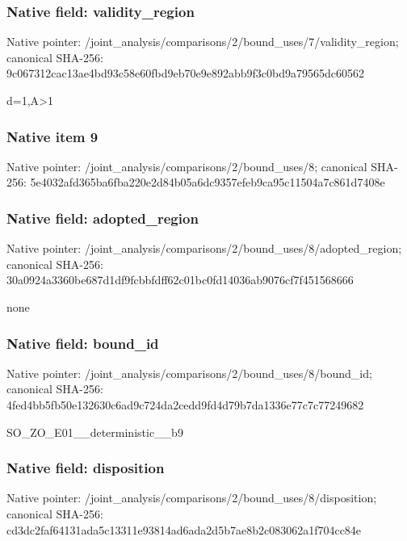 \documentclass[10pt,a4paper]{article}
\begin{document}
\subsubsection{Native field: validity\_\allowbreak{}region}
Native pointer: /joint\_\allowbreak{}analysis/comparisons/2/bound\_\allowbreak{}uses/7/validity\_\allowbreak{}region; canonical SHA-256: 9c067312cac13ae4bd93c58e60fbd9eb70e9e892abb9f3c0bd9a79565dc60562

\begingroup\raggedright\sloppy d=\allowbreak{}1,\allowbreak{}A>1\par\endgroup

\subsubsection{Native item 9}
Native pointer: /joint\_\allowbreak{}analysis/comparisons/2/bound\_\allowbreak{}uses/8; canonical SHA-256: 5e4032afd365ba6fba220e2d84b05a6dc9357efeb9ca95c11504a7c861d7408e

\subsubsection{Native field: adopted\_\allowbreak{}region}
Native pointer: /joint\_\allowbreak{}analysis/comparisons/2/bound\_\allowbreak{}uses/8/adopted\_\allowbreak{}region; canonical SHA-256: 30a0924a3360be687d1df9fcbbfdff62c01bc0fd14036ab9076cf7f451568666

\begingroup\raggedright\sloppy none\par\endgroup

\subsubsection{Native field: bound\_\allowbreak{}id}
Native pointer: /joint\_\allowbreak{}analysis/comparisons/2/bound\_\allowbreak{}uses/8/bound\_\allowbreak{}id; canonical SHA-256: 4fed4bb5fb50e132630c6ad9c724da2cedd9fd4d79b7da1336e77c7c77249682

\begingroup\raggedright\sloppy SO\_\allowbreak{}ZO\_\allowbreak{}E01\_\allowbreak{}\_\allowbreak{}deterministic\_\allowbreak{}\_\allowbreak{}b9\par\endgroup

\subsubsection{Native field: disposition}
Native pointer: /joint\_\allowbreak{}analysis/comparisons/2/bound\_\allowbreak{}uses/8/disposition; canonical SHA-256: cd3dc2faf64131ada5c13311e93814ad6ada2d5b7ae8b2c083062a1f704cc84e
\end{document}
